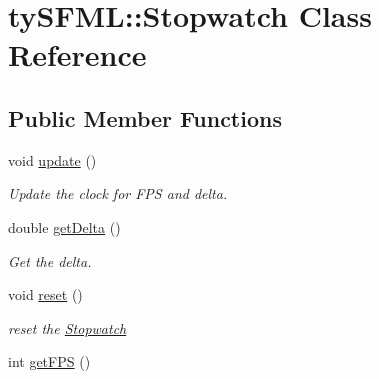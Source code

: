 \hypertarget{classty_s_f_m_l_1_1_stopwatch}{}\section{ty\+S\+F\+M\+L\+:\+:Stopwatch Class Reference}
\label{classty_s_f_m_l_1_1_stopwatch}
\subsection*{Public Member Functions}
\begin{DoxyCompactItemize}
\item 
\hypertarget{classty_s_f_m_l_1_1_stopwatch_ade4cd5dfa53894f0e2a8ff1fac0448ed}{}void \hyperlink{classty_s_f_m_l_1_1_stopwatch_ade4cd5dfa53894f0e2a8ff1fac0448ed}{update} ()\label{classty_s_f_m_l_1_1_stopwatch_ade4cd5dfa53894f0e2a8ff1fac0448ed}

\begin{DoxyCompactList}\small\item\em Update the clock for F\+P\+S and delta. \end{DoxyCompactList}\item 
\hypertarget{classty_s_f_m_l_1_1_stopwatch_a879aaf8fc50b97a47af816e2b25f454c}{}double \hyperlink{classty_s_f_m_l_1_1_stopwatch_a879aaf8fc50b97a47af816e2b25f454c}{get\+Delta} ()\label{classty_s_f_m_l_1_1_stopwatch_a879aaf8fc50b97a47af816e2b25f454c}

\begin{DoxyCompactList}\small\item\em Get the delta. \end{DoxyCompactList}\item 
\hypertarget{classty_s_f_m_l_1_1_stopwatch_aaae31066467774e3480318b279cf276c}{}void \hyperlink{classty_s_f_m_l_1_1_stopwatch_aaae31066467774e3480318b279cf276c}{reset} ()\label{classty_s_f_m_l_1_1_stopwatch_aaae31066467774e3480318b279cf276c}

\begin{DoxyCompactList}\small\item\em reset the \hyperlink{classty_s_f_m_l_1_1_stopwatch}{Stopwatch} \end{DoxyCompactList}\item 
int \hyperlink{classty_s_f_m_l_1_1_stopwatch_a8f8a72c1f245089ca0a60ca9f5e3ea98}{get\+F\+P\+S} ()
\end{DoxyCompactItemize}

